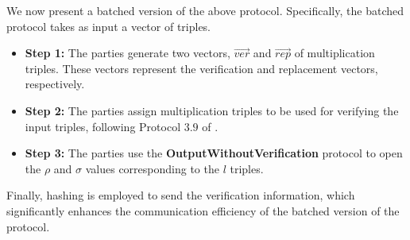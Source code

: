 \noindent We now present a batched version of the above protocol. 
Specifically, the batched protocol takes as input a vector of triples.
\begin{itemize}
    \item {\bf Step 1:} The parties generate two vectors, $\vec{ver}$ and $\vec{rep}$ of multiplication triples.
    These vectors represent the verification and replacement vectors, respectively.
    \item {\bf Step 2:} The parties assign multiplication triples to be used for verifying the input triples, following Protocol $3.9$ of \cite{SP:ABFLLN17}.
    \item {\bf Step 3:} The parties use the {\bf OutputWithoutVerification} protocol to open the $\rho$ and $\sigma$ values corresponding to the $l$ triples.
\end{itemize}
Finally, hashing is employed to send the verification information, which significantly enhances the communication efficiency of the batched version of the protocol.

